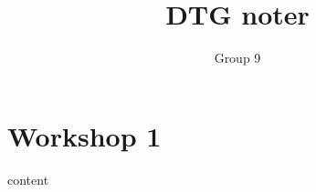 \documentclass[11pt]{book}
\title{DTG noter}
\author{Group 9}
\begin{document}
    \maketitle


    \chapter{Workshop 1}\label{ch:workshop-1}

    {content}
\end{document}
